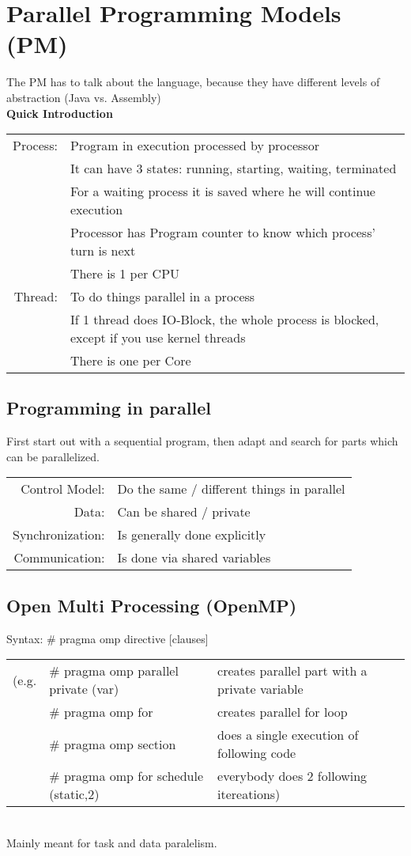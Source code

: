 \documentclass[a4paper]{article}
\begin{document}
\section{Parallel Programming Models (PM)}
The PM has to talk about the language, because they have different levels of abstraction (Java vs. Assembly)\\
{\bf Quick Introduction}\\
\begin{tabular}{rl}
Process:& Program in execution processed by processor\\&It can have 3 states: running, starting, waiting, terminated\\& For a waiting process it is saved where he will continue execution\\&Processor has Program counter to know which process' turn is next\\&There is 1 per CPU\\
Thread:& To do things parallel in a process\\& If 1 thread does IO-Block, the whole process is blocked, except if you use kernel threads\\& There is one per Core
\end{tabular}

\subsection{Programming in parallel}
First start out with a sequential program, then adapt and search for parts which can be parallelized.\\
\begin{tabular}{rl}
Control Model:& Do the same / different things in parallel\\
Data:& Can be shared / private\\
Synchronization:& Is generally done explicitly\\
Communication:& Is done via shared variables
\end{tabular}

\subsection{Open Multi Processing (OpenMP)}
Syntax: \# pragma omp directive [clauses] \\
\begin{tabular}{lll}
(e.g. &\# pragma omp parallel private (var)&creates parallel part with a private variable\\
&\# pragma omp for&creates parallel for loop\\
&\# pragma omp section&does a single execution of following code\\
&\# pragma omp for schedule (static,2)&everybody does 2 following itereations)\\
\end{tabular}\\
Mainly meant for task and data paralelism.
\end{document}
